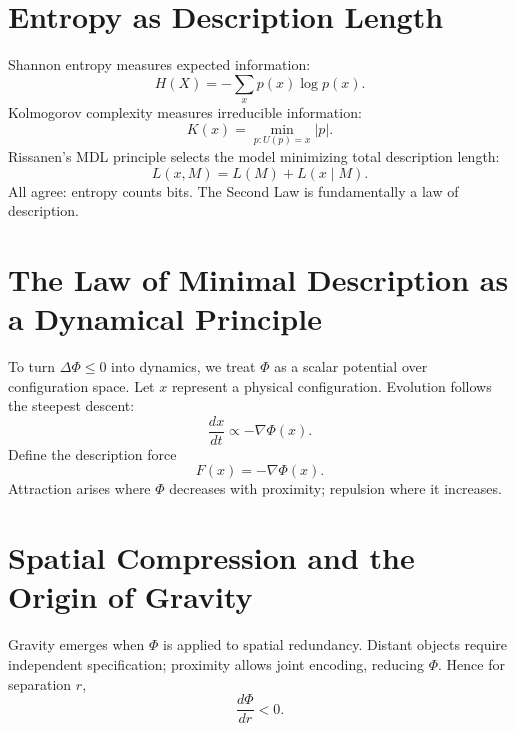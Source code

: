 \documentclass[aps,preprint,onecolumn,longbibliography,nofootinbib]{revtex4-2}
\numberwithin{equation}{section}        %
\begin{document}
\section{Entropy as Description Length}
Shannon entropy measures expected information:
\begin{equation}
H(X) = -\sum_x p(x)\log p(x). \label{eq:shannon}
\end{equation}
Kolmogorov complexity measures irreducible information:
\begin{equation}
K(x) = \min_{p:U(p)=x} |p|. \label{eq:kolmogorov}
\end{equation}
Rissanen's MDL principle selects the model minimizing total description length:
\begin{equation}
L(x,M) = L(M)+L(x\mid M). \label{eq:mdl}
\end{equation}
All agree: entropy counts bits. The Second Law is fundamentally a law of description.

\section{The Law of Minimal Description as a Dynamical Principle}
To turn $\Delta\Phi \le 0$ into dynamics, we treat $\Phi$ as a scalar potential over configuration space. Let $x$ represent a physical configuration. Evolution follows the steepest descent:
\begin{equation}
\frac{dx}{dt} \propto -\nabla \Phi(x). \label{eq:dynamics}
\end{equation}
Define the description force
\begin{equation}
F(x) = -\nabla \Phi(x). \label{eq:force}
\end{equation}
Attraction arises where $\Phi$ decreases with proximity; repulsion where it increases.

\section{Spatial Compression and the Origin of Gravity}
Gravity emerges when $\Phi$ is applied to spatial redundancy. Distant objects require independent specification; proximity allows joint encoding, reducing $\Phi$. Hence for separation $r$,
\begin{equation}
\frac{d\Phi}{dr} < 0. \label{eq:dphidr}
\end{equation}
\end{document}
